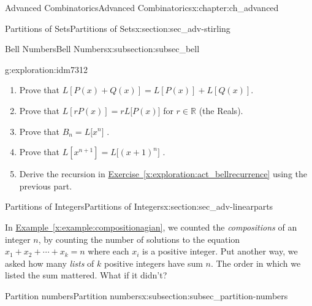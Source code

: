 \documentclass[oneside,10pt,]{book}
\numberwithin{equation}{chapter}
\def\R{\mathbb R}
\begin{document}
\begin{chapterptx}{Advanced Combinatorics}{}{Advanced Combinatorics}{}{}{x:chapter:ch_advanced}
\begin{sectionptx}{Partitions of Sets}{}{Partitions of Sets}{}{}{x:section:sec_adv-stirling}
\begin{subsectionptx}{Bell Numbers}{}{Bell Numbers}{}{}{x:subsection:subsec_bell}
\begin{exploration}{}{g:exploration:idm7312}
%
\begin{enumerate}
\item{}Prove that \(L\left\lbrack P\left( x \right) + Q\left( x \right) \right\rbrack = L\left\lbrack P\left( x \right) \right\rbrack + L\left\lbrack Q\left( x \right) \right\rbrack.\)%
\item{}Prove that \(L\left\lbrack rP \left( x \right) \right\rbrack = rL\lbrack P\left( x \right)\rbrack\) for \(r \in \R\) (the Reals).%
\item{}Prove that \(B_{n} = L\lbrack x^{n}\rbrack\) .%
\item{}Prove that \(L\left\lbrack x^{n + 1} \right\rbrack = L\lbrack\left( x + 1 \right)^{n}\rbrack\) .%
\item{}Derive the recursion in \hyperref[x:exploration:act_bellrecurrence]{Exercise~\ref{x:exploration:act_bellrecurrence}} using the previous part.%
\end{enumerate}
%
\end{exploration}
\end{subsectionptx}
\end{sectionptx}
%
%
\typeout{************************************************}
\typeout{************************************************}
%
\begin{sectionptx}{Partitions of Integers}{}{Partitions of Integers}{}{}{x:section:sec_adv-linearparts}
\begin{introduction}{}%
In \hyperref[x:example:compositionagian]{Example~\ref{x:example:compositionagian}}, we counted the \emph{compositions} of an integer \(n\), by counting the number of solutions to the equation \(x_1 + x_2 + \cdots + x_k = n\) where each \(x_i\) is a positive integer.  Put another way, we asked how many \emph{lists} of \(k\) positive integers have sum \(n\).  The order in which we listed the sum mattered.  What if it didn't?%
\end{introduction}%
%
%
\typeout{************************************************}
\typeout{************************************************}
%
\begin{subsectionptx}{Partition numbers}{}{Partition numbers}{}{}{x:subsection:subsec_partition-numbers}

\end{subsectionptx}
\end{sectionptx}
\end{chapterptx}
\end{document}
